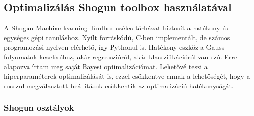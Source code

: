 \subsection{Optimalizálás Shogun toolbox használatával}

A Shogun Machine learning Toolbox széles tárházat biztosít a hatékony és egységes gépi tanuláshoz. Nyílt forráskódú, C-ben implementált, de számos programozási nyelven elérhető, így Pythonul is. Hatékony eszköz a Gauss folyamatok kezeléséhez, akár regresszióról, akár klasszifikációról van szó. Erre alapozva írtam meg saját Bayesi optimalizációmat. Lehetővé teszi a hiperparaméterek optimalizálását is, ezzel csökkentve annak a lehetőségét, hogy a rosszul megválasztott beállítások csökkentik az optimalizáció hatékonyságát.

\subsubsection{Shogun osztályok}

